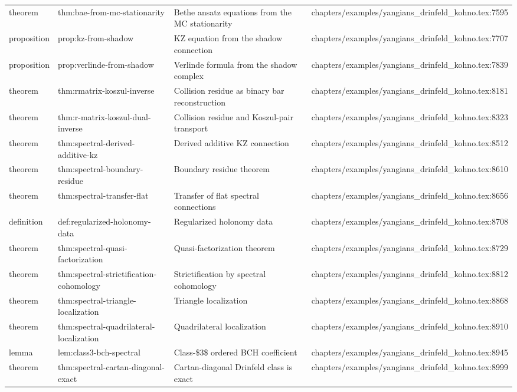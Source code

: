 \documentclass[11pt]{article}
\begin{document}
\begin{longtable}{L{0.10\textwidth}L{0.26\textwidth}L{0.42\textwidth}L{0.22\textwidth}}
theorem & thm:bae-from-mc-stationarity & Bethe ansatz equations from the MC stationarity & chapters/examples/yangians\_drinfeld\_kohno.tex:7595\\
proposition & prop:kz-from-shadow & KZ equation from the shadow connection & chapters/examples/yangians\_drinfeld\_kohno.tex:7707\\
proposition & prop:verlinde-from-shadow & Verlinde formula from the shadow complex & chapters/examples/yangians\_drinfeld\_kohno.tex:7839\\
theorem & thm:rmatrix-koszul-inverse & Collision residue as binary bar reconstruction & chapters/examples/yangians\_drinfeld\_kohno.tex:8181\\
theorem & thm:r-matrix-koszul-dual-inverse & Collision residue and Koszul-pair transport & chapters/examples/yangians\_drinfeld\_kohno.tex:8323\\
theorem & thm:spectral-derived-additive-kz & Derived additive KZ connection & chapters/examples/yangians\_drinfeld\_kohno.tex:8512\\
theorem & thm:spectral-boundary-residue & Boundary residue theorem & chapters/examples/yangians\_drinfeld\_kohno.tex:8610\\
theorem & thm:spectral-transfer-flat & Transfer of flat spectral connections & chapters/examples/yangians\_drinfeld\_kohno.tex:8656\\
definition & def:regularized-holonomy-data & Regularized holonomy data & chapters/examples/yangians\_drinfeld\_kohno.tex:8708\\
theorem & thm:spectral-quasi-factorization & Quasi-factorization theorem & chapters/examples/yangians\_drinfeld\_kohno.tex:8729\\
theorem & thm:spectral-strictification-cohomology & Strictification by spectral cohomology & chapters/examples/yangians\_drinfeld\_kohno.tex:8812\\
theorem & thm:spectral-triangle-localization & Triangle localization & chapters/examples/yangians\_drinfeld\_kohno.tex:8868\\
theorem & thm:spectral-quadrilateral-localization & Quadrilateral localization & chapters/examples/yangians\_drinfeld\_kohno.tex:8910\\
lemma & lem:class3-bch-spectral & Class-\$3\$ ordered BCH coefficient & chapters/examples/yangians\_drinfeld\_kohno.tex:8945\\
theorem & thm:spectral-cartan-diagonal-exact & Cartan-diagonal Drinfeld class is exact & chapters/examples/yangians\_drinfeld\_kohno.tex:8999\\

\end{longtable}
\end{document}
